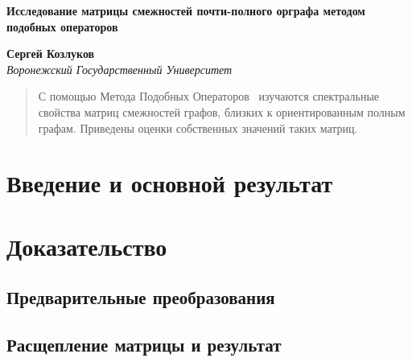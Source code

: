 \documentclass[11pt,a4paper,twoside]{article}
\theoremstyle{definition}
\begin{document}

\begin{center}
    \textbf{Исследование матрицы смежностей почти-полного орграфа методом подобных операторов}
    
    \textbf{Сергей Козлуков}\\[2mm]
    \emph{Воронежский Государственный Университет}
\end{center}

\begin{abstract}
    С помощью Метода Подобных Операторов~\cite{baskakov-harmonic,baskakov1983}
    изучаются спектральные свойства
    матриц смежностей графов, близких к ориентированным полным графам.
    Приведены оценки собственных значений таких матриц.
\end{abstract}

\section{Введение и основной результат}

\section{Доказательство}
\subsection*{Предварительные преобразования}

\subsection*{Расщепление матрицы и результат}



\printbibliography
\end{document}
